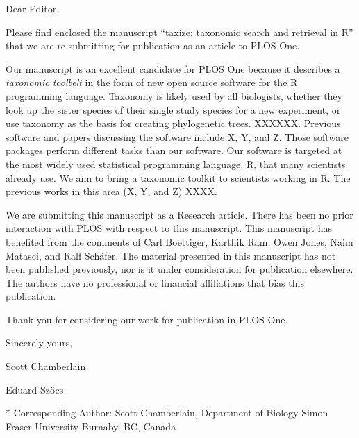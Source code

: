 \documentclass[11pt]{article}
\begin{document}
Dear Editor,

Please find enclosed the manuscript “taxize: taxonomic search and retrieval in R” that we are re-submitting for publication as an article to PLOS One. 

Our manuscript is an excellent candidate for PLOS One because it describes a \emph{taxonomic toolbelt} in the form of new open source software for the R programming language. Taxonomy is likely used by all biologists, whether they look up the sister species of their single study species for a new experiment, or use taxonomy as the basis for creating phylogenetic trees. XXXXXX. Previous software and papers discussing the software include X, Y, and Z. Those software packages perform different tasks than our software. Our software is targeted at the most widely used statistical programming language, R, that many scientists already use. We aim to bring a taxonomic toolkit to scientists working in R. The previous works in this area (X, Y, and Z) XXXX. 

We are submitting this manuscript as a Research article. There has been no prior interaction with PLOS with respect to this manuscript. This manuscript has benefited from the comments of Carl Boettiger, Karthik Ram, Owen Jones, Naim Matasci, and Ralf Sch\"{a}fer. The material presented in this manuscript has not been published previously, nor is it under consideration for publication elsewhere. The authors have no professional or financial affiliations that bias this publication.

Thank you for considering our work for publication in PLOS One.

Sincerely yours,

Scott Chamberlain

Eduard Sz\"{o}cs

* Corresponding Author: 
Scott Chamberlain, Department of Biology Simon Fraser University Burnaby, BC, Canada
\end{document}
